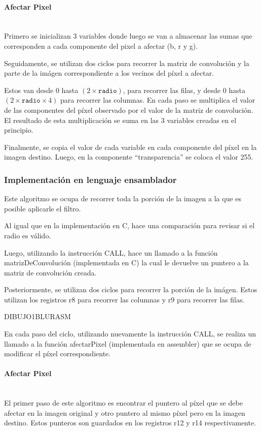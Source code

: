       \paragraph{Afectar Pixel} \mbox{} \\
        Primero se inicializan 3 variables donde luego se van a almacenar las sumas que corresponden a cada componente del pixel a afectar (b, r y g). 

        Seguidamente, se utilizan dos ciclos para recorrer la matriz de convolución y la parte de la imágen correspondiente a los vecinos del píxel a afectar.  
        
        Estos van desde $0$ hasta $(2 \times \mathtt{radio})$, para recorrer las filas, y desde $0$ hasta $(2 \times \mathtt{radio} \times 4)$ para recorrer las columnas. En cada paso se multiplica el valor de las componentes del píxel observado por el valor de la matriz de convolución. El resultado de esta multiplicación se suma en las 3 variables creadas en el principio. 
        
        Finalmente, se copia el valor de cada variable en cada componente del píxel en la imagen destino. Luego, en la componente “transparencia” se coloca el valor 255.  

    \subsubsection{Implementación en lenguaje ensamblador} 
      Este algoritmo se ocupa de recorrer toda la porción de la imagen a la que es posible aplicarle el filtro. 
      
      Al igual que en la implementación en C, hace una comparación para revisar si el radio es válido. 
      
      Luego, utilizando la instrucción CALL, hace un llamado a la función matrizDeConvolución (implementada en C) la cual le devuelve un puntero a la matriz de convolución creada. 
      
      Posteriormente, se utilizan dos ciclos para recorrer la porción de la imágen. Estos utilizan los registros r8 para recorrer las columnas y r9 para recorrer las filas.
  
      DIBUJO1BLURASM
      
      En cada paso del ciclo, utilizando nuevamente la instrucción CALL, se realiza un llamado a la función afectarPixel (implementada en assembler) que se ocupa de modificar el píxel correspondiente. 

      \paragraph{Afectar Pixel}\mbox{} \\
        El primer paso de este algoritmo es encontrar el puntero al píxel que se debe afectar en la imagen original y otro puntero al mismo píxel pero en la imagen destino. Estos punteros son guardados en los registros r12 y r14 respectivamente.   

